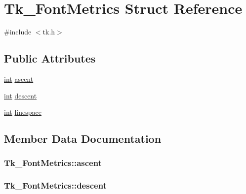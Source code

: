 \hypertarget{struct_tk___font_metrics}{}\section{Tk\+\_\+\+Font\+Metrics Struct Reference}
\label{struct_tk___font_metrics}


{\ttfamily \#include $<$tk.\+h$>$}

\subsection*{Public Attributes}
\begin{DoxyCompactItemize}
\item 
\hyperlink{tk_8h_a83f82f76e7fed06f4c49d2db94028a6d}{int} \hyperlink{struct_tk___font_metrics_a02b61ee0e57ffa73569b90a7cb11c98a}{ascent}
\item 
\hyperlink{tk_8h_a83f82f76e7fed06f4c49d2db94028a6d}{int} \hyperlink{struct_tk___font_metrics_affbe0da253471d0bb4c24e742befd6a9}{descent}
\item 
\hyperlink{tk_8h_a83f82f76e7fed06f4c49d2db94028a6d}{int} \hyperlink{struct_tk___font_metrics_ab5a9c7940e6681a59cbf0400b16b76a7}{linespace}
\end{DoxyCompactItemize}


\subsection{Member Data Documentation}
\subsubsection[{\texorpdfstring{ascent}{ascent}}]{ Tk\+\_\+\+Font\+Metrics\+::ascent}\hypertarget{struct_tk___font_metrics_a02b61ee0e57ffa73569b90a7cb11c98a}{}\label{struct_tk___font_metrics_a02b61ee0e57ffa73569b90a7cb11c98a}
\subsubsection[{\texorpdfstring{descent}{descent}}]{ Tk\+\_\+\+Font\+Metrics\+::descent}\hypertarget{struct_tk___font_metrics_affbe0da253471d0bb4c24e742befd6a9}{}\label{struct_tk___font_metrics_affbe0da253471d0bb4c24e742befd6a9}
